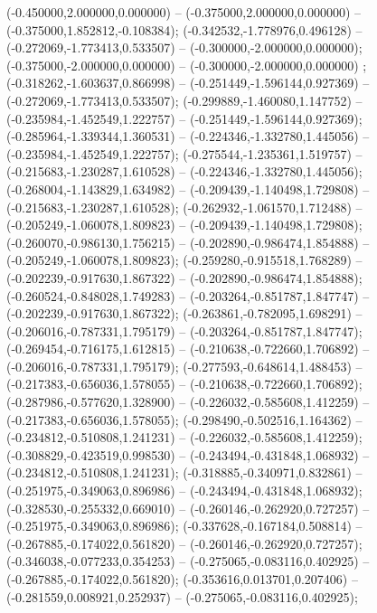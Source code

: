  (-0.450000,2.000000,0.000000) -- (-0.375000,2.000000,0.000000) -- (-0.375000,1.852812,-0.108384);
 (-0.342532,-1.778976,0.496128) -- (-0.272069,-1.773413,0.533507) -- (-0.300000,-2.000000,0.000000);
 (-0.375000,-2.000000,0.000000) -- (-0.300000,-2.000000,0.000000) ;
 (-0.318262,-1.603637,0.866998) -- (-0.251449,-1.596144,0.927369) -- (-0.272069,-1.773413,0.533507);
 (-0.299889,-1.460080,1.147752) -- (-0.235984,-1.452549,1.222757) -- (-0.251449,-1.596144,0.927369);
 (-0.285964,-1.339344,1.360531) -- (-0.224346,-1.332780,1.445056) -- (-0.235984,-1.452549,1.222757);
 (-0.275544,-1.235361,1.519757) -- (-0.215683,-1.230287,1.610528) -- (-0.224346,-1.332780,1.445056);
 (-0.268004,-1.143829,1.634982) -- (-0.209439,-1.140498,1.729808) -- (-0.215683,-1.230287,1.610528);
 (-0.262932,-1.061570,1.712488) -- (-0.205249,-1.060078,1.809823) -- (-0.209439,-1.140498,1.729808);
 (-0.260070,-0.986130,1.756215) -- (-0.202890,-0.986474,1.854888) -- (-0.205249,-1.060078,1.809823);
 (-0.259280,-0.915518,1.768289) -- (-0.202239,-0.917630,1.867322) -- (-0.202890,-0.986474,1.854888);
 (-0.260524,-0.848028,1.749283) -- (-0.203264,-0.851787,1.847747) -- (-0.202239,-0.917630,1.867322);
 (-0.263861,-0.782095,1.698291) -- (-0.206016,-0.787331,1.795179) -- (-0.203264,-0.851787,1.847747);
 (-0.269454,-0.716175,1.612815) -- (-0.210638,-0.722660,1.706892) -- (-0.206016,-0.787331,1.795179);
 (-0.277593,-0.648614,1.488453) -- (-0.217383,-0.656036,1.578055) -- (-0.210638,-0.722660,1.706892);
 (-0.287986,-0.577620,1.328900) -- (-0.226032,-0.585608,1.412259) -- (-0.217383,-0.656036,1.578055);
 (-0.298490,-0.502516,1.164362) -- (-0.234812,-0.510808,1.241231) -- (-0.226032,-0.585608,1.412259);
 (-0.308829,-0.423519,0.998530) -- (-0.243494,-0.431848,1.068932) -- (-0.234812,-0.510808,1.241231);
 (-0.318885,-0.340971,0.832861) -- (-0.251975,-0.349063,0.896986) -- (-0.243494,-0.431848,1.068932);
 (-0.328530,-0.255332,0.669010) -- (-0.260146,-0.262920,0.727257) -- (-0.251975,-0.349063,0.896986);
 (-0.337628,-0.167184,0.508814) -- (-0.267885,-0.174022,0.561820) -- (-0.260146,-0.262920,0.727257);
 (-0.346038,-0.077233,0.354253) -- (-0.275065,-0.083116,0.402925) -- (-0.267885,-0.174022,0.561820);
 (-0.353616,0.013701,0.207406) -- (-0.281559,0.008921,0.252937) -- (-0.275065,-0.083116,0.402925);
